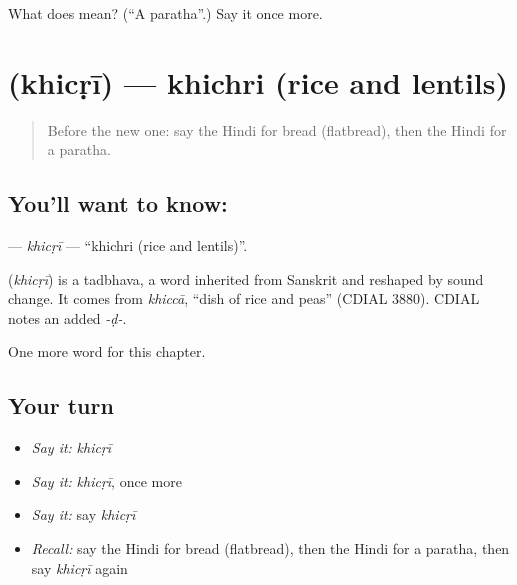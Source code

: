 \begin{tcolorbox}[breakable,colback=teal!4,colframe=teal!35!black,title={Before you move on}]
What does  mean? (\textquotedblleft{}A paratha\textquotedblright{}.) Say it once more.
\end{tcolorbox}
\section[\texorpdfstring{\hi{खिचड़ी} (khicṛī)}{खिचड़ी (khicṛī)}]{ (khicṛī) — khichri (rice and lentils)}

\label{lesson:HI-C210-khicri}



\begin{quote}
Before the new one: say the Hindi for bread (flatbread), then the Hindi for a paratha.
\end{quote}

\subsection*{You'll want to know: }
\textbf{} — \emph{khicṛī} — \textquotedblleft{}khichri (rice and lentils)\textquotedblright{}.

\begin{cousinweb}
\textbf{} (\emph{khicṛī}) is a tadbhava, a word inherited from Sanskrit and reshaped by sound change. It comes from \emph{khiccā}, \textquotedblleft{}dish of rice and peas\textquotedblright{} (CDIAL 3880). CDIAL notes an added \emph{-ḍ-}.
\end{cousinweb}

\begin{grammarlens}[title={What you've built}]
One more word for this chapter.
\end{grammarlens}

\subsection*{Your turn}
\begin{itemize}
\raggedright
  \item \emph{Say it:} \emph{khicṛī}
  \item \emph{Say it:} \emph{khicṛī}, once more
  \item \emph{Say it:} say \emph{khicṛī}
  \item \emph{Recall:} say the Hindi for bread (flatbread), then the Hindi for a paratha, then say \emph{khicṛī} again
\end{itemize}

